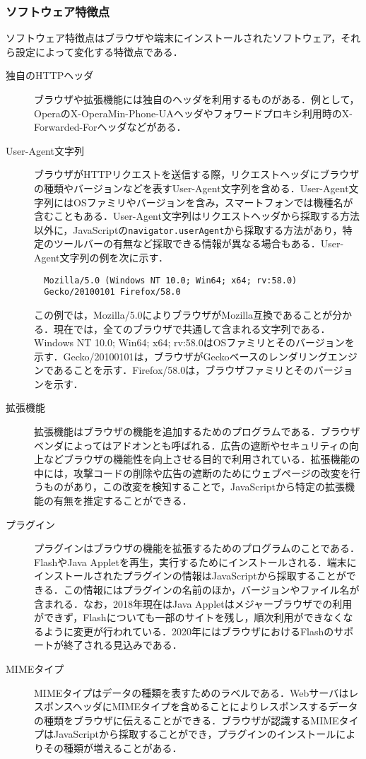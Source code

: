 \subsubsection{ソフトウェア特徴点}
ソフトウェア特徴点はブラウザや端末にインストールされたソフトウェア，それら設定によって変化する特徴点である．
\begin{description}
  \item[独自のHTTPヘッダ]ブラウザや拡張機能には独自のヘッダを利用するものがある．例として，OperaのX-OperaMin-Phone-UAヘッダやフォワードプロキシ利用時のX-Forwarded-Forヘッダなどがある．
  \item[User-Agent文字列]ブラウザがHTTPリクエストを送信する際，リクエストヘッダにブラウザの種類やバージョンなどを表すUser-Agent文字列を含める．User-Agent文字列にはOSファミリやバージョンを含み，スマートフォンでは機種名が含むこともある．User-Agent文字列はリクエストヘッダから採取する方法以外に，JavaScriptの\texttt{navigator.userAgent}から採取する方法があり，特定のツールバーの有無など採取できる情報が異なる場合もある．User-Agent文字列の例を次に示す．
  \begin{verbatim}
  Mozilla/5.0 (Windows NT 10.0; Win64; x64; rv:58.0)
  Gecko/20100101 Firefox/58.0
  \end{verbatim}
  この例では，Mozilla/5.0によりブラウザがMozilla互換であることが分かる．現在では，全てのブラウザで共通して含まれる文字列である．Windows NT 10.0; Win64; x64; rv:58.0はOSファミリとそのバージョンを示す．Gecko/20100101は，ブラウザがGeckoベースのレンダリングエンジンであることを示す．Firefox/58.0は，ブラウザファミリとそのバージョンを示す．
  \item[拡張機能]拡張機能はブラウザの機能を追加するためのプログラムである．ブラウザベンダによってはアドオンとも呼ばれる．広告の遮断やセキュリティの向上などブラウザの機能性を向上させる目的で利用されている．拡張機能の中には，攻撃コードの削除や広告の遮断のためにウェブページの改変を行うものがあり，この改変を検知することで，JavaScriptから特定の拡張機能の有無を推定することができる．
  \item[プラグイン]プラグインはブラウザの機能を拡張するためのプログラムのことである．FlashやJava Appletを再生，実行するためにインストールされる．端末にインストールされたプラグインの情報はJavaScriptから採取することができる．この情報にはプラグインの名前のほか，バージョンやファイル名が含まれる．なお，2018年現在はJava Appletはメジャーブラウザでの利用ができず，Flashについても一部のサイトを残し，順次利用ができなくなるように変更が行われている．2020年にはブラウザにおけるFlashのサポートが終了される見込みである．
  \item[MIMEタイプ]MIMEタイプはデータの種類を表すためのラベルである．WebサーバはレスポンスヘッダにMIMEタイプを含めることによりレスポンスするデータの種類をブラウザに伝えることができる．ブラウザが認識するMIMEタイプはJavaScriptから採取することができ，プラグインのインストールによりその種類が増えることがある．

\end{description}
